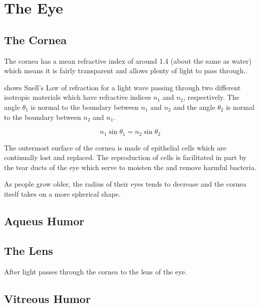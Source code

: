 
\chapter{The Eye}

\label{anatomy} %


\section{The Cornea}

The cornea has a mean refractive index of around 1.4 (about the same as water) which means it is fairly transparent and allows plenty of light to pass through.\cite{thoft1983x, patel1994refractive}.

 shows Snell's Law of refraction for a light wave passing
through two different isotropic materials which have refractive indices $n_1$ and $n_2$, respectively.
The angle $\theta_1$ is normal to the boundary between $n_1$ and $n_2$ and the angle $\theta_2$ is normal to the boundary between $n_2$ and $n_1$.

\begin{equation}
n_1\sin\theta_1=n_2\sin\theta_2
\label{eq:refractive}
\end{equation}



The outermost surface of the cornea is made of epithelial cells which
are continually lost and replaced.\cite{jester1999cellular,hassell2010molecular}
The reproduction of cells is facilitated in part by the tear ducts of the eye which  serve to moisten the  and remove harmful bacteria.\cite{}

As people grow older, the radius of their eyes tends to decrease and the cornea itself takes on a more spherical shape.\cite{guirao2000optical}

\section{Aqueus Humor}

\section{The Lens}
After light passes through the cornea to the lens of the eye.

\section{Vitreous Humor}

